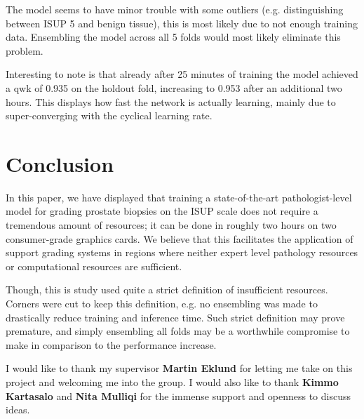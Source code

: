 \documentclass{mod-comjnl}
\begin{document}
The model seems to have minor trouble with some outliers (e.g. distinguishing between ISUP 5 and benign tissue), this is most likely due to not enough training data. Ensembling the model across all 5 folds would most likely eliminate this problem.

Interesting to note is that already after 25 minutes of training the model achieved a \acrshort{qwk} of 0.935 on the holdout fold, increasing to 0.953 after an additional two hours. This displays how fast the network is actually learning, mainly due to super-converging with the cyclical learning rate.

\section{Conclusion}
In this paper, we have displayed that training a state-of-the-art pathologist-level model for grading prostate biopsies on the ISUP scale does not require a tremendous amount of resources; it can be done in roughly two hours on two consumer-grade graphics cards. We believe that this facilitates the application of support grading systems in regions where neither expert level pathology resources or computational resources are sufficient. 

Though, this is study used quite a strict definition of insufficient resources. Corners were cut to keep this definition, e.g. no ensembling was made to drastically reduce training and inference time. Such strict definition may prove premature, and simply ensembling all folds may be a worthwhile compromise to make in comparison to the performance increase.

\begin{ack}
I would like to thank my supervisor \textbf{Martin Eklund} for letting me take on this project and welcoming me into the group. I would also like to thank \textbf{Kimmo Kartasalo} and \textbf{Nita Mulliqi} for the immense support and openness to discuss ideas.
\end{ack}

\printbibliography
\end{document}
